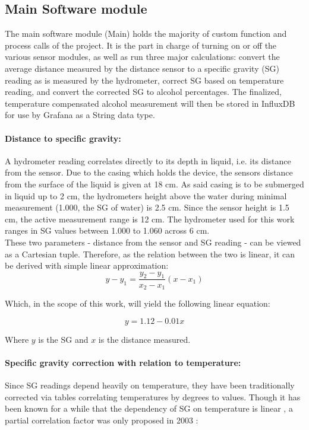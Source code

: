 \documentclass[twoside]{ctuthesis}
\theoremstyle{plain}
\theoremstyle{definition}
\theoremstyle{note}
\begin{document}
\subsection{Main Software module}
The main software module (Main) holds the majority of custom function and process calls of the project. It is the part in charge of turning on or off the various sensor modules, as well as run three major calculations: convert the average distance measured by the distance sensor to a specific gravity (SG) reading as is measured by the hydrometer, correct SG based on temperature reading, and convert the corrected SG to alcohol percentages. The finalized, temperature compensated alcohol measurement will then be stored in InfluxDB for use by Grafana as a String data type.

\paragraph{Distance to specific gravity:}
A hydrometer reading correlates directly to its depth in liquid, i.e. its distance from the sensor. Due to the casing which holds the device, the sensors distance from the surface of the liquid is given at 18 cm. As said casing is to be submerged in liquid up to 2 cm, the hydrometers height above the water during minimal measurement (1.000, the SG of water) is 2.5 cm. Since the sensor height is 1.5 cm, the active measurement range is 12 cm. The hydrometer used for this work ranges in SG values between 1.000 to 1.060 across 6 cm.\\
These two parameters - distance from the sensor and SG reading - can be viewed as a Cartesian tuple. Therefore, as the relation between the two is linear, it can be derived with simple linear approximation:
\begin{equation}
y-y_1 = \frac{y_2 - y_1}{x_2 - x_1}(x - x_1)
\end{equation}

Which, in the scope of this work, will yield the following linear equation:

\begin{equation}
	y = 1.12 - 0.01 x
\end{equation}

Where $y$ is the SG and $x$ is the distance measured.\\

\paragraph{Specific gravity correction with relation to temperature:}
Since SG readings depend heavily on temperature, they have been traditionally corrected via tables correlating temperatures by degrees to values. Though it has been known for a while that the dependency of SG on temperature is linear \cite{Temp_To_SG}, a partial correlation factor was only proposed in 2003 \cite{Joy_Of_Brewing}:
\end{document}
